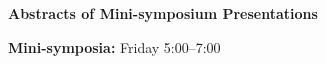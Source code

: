 \begin{center}
{\Large \bfseries Abstracts of Mini-symposium Presentations}
\end{center}
\vspace{1ex}


\begin{center}
\label{mini-friday}
{\large {\bf Mini-symposia:} Friday 5:00--7:00}
\end{center}
\vspace*{1ex}




